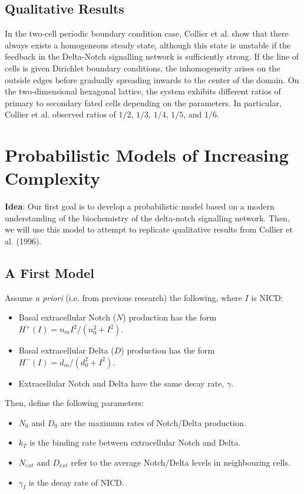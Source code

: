 \documentclass{article}
\begin{document}
\begin{flushleft}
\subsection{Qualitative Results}

In the two-cell periodic boundary condition case, Collier et al. show that there always exists a homogeneous steady state, although this state is unstable if the feedback in the Delta-Notch signalling network is sufficiently strong. If the line of cells is given Dirichlet boundary conditions, the inhomogeneity arises on the outside edges before gradually spreading inwards to the center of the domain. On the two-dimensional hexagonal lattice, the system exhibits different ratios of primary to secondary fated cells depending on the parameters. In particular, Collier et al. observed ratios of $1/2$, $1/3$, $1/4$, $1/5$, and $1/6$.

\section{Probabilistic Models of Increasing Complexity}

\textbf{Idea}: Our first goal is to develop a probabilistic model based on a modern understanding of the biochemistry of the delta-notch signalling network. Then, we will use this model to attempt to replicate qualitative results from Collier et al. (1996).

\subsection{A First Model}

Assume \emph{a priori} (i.e. from previous research) the following, where $I$ is NICD:

\begin{itemize}
  \item Basal extracellular Notch ($N$) production has the form $H^{+}(I) = n_{m}I^2/(n_{0}^2 + I^2)$. 
  \item Basal extracellular Delta ($D$) production has the form $H^{-}(I) = d_{m}/(d_{0}^2 + I^2)$.
  \item Extracellular Notch and Delta have the same decay rate, $\gamma$.
\end{itemize}

Then, define the following parameters:

\begin{itemize}
  \item $N_{0}$ and $D_{0}$ are the maximum rates of Notch/Delta production.
  \item $k_{T}$ is the binding rate between extracellular Notch and Delta.
  \item $N_{ext}$ and $D_{ext}$ refer to the average Notch/Delta levels in neighbouring cells.
  \item $\gamma_{I}$ is the decay rate of NICD.
\end{itemize}


\end{flushleft}
\end{document}
